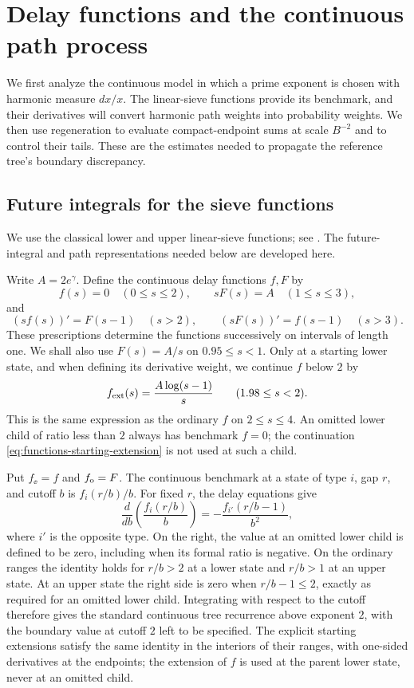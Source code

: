 \section{Delay functions and the continuous path process}
\label{sec:functions}

We first analyze the continuous model in which a prime exponent is chosen
with harmonic measure \(dx/x\).  The linear-sieve functions provide its
benchmark, and their derivatives will convert harmonic path weights into
probability weights.  We then use regeneration to evaluate compact-endpoint
sums at scale \(B^{-2}\) and to control their tails.  These are the
estimates needed to propagate the reference tree's boundary discrepancy.

\subsection{Future integrals for the sieve functions}

We use the classical lower and upper linear-sieve functions; see
\cite[Section~21.2.2]{MontgomeryVaughanII}. The future-integral and path
representations needed below are developed here.

Write \(A=2e^\gamma\).  Define the continuous delay functions \(f,F\) by
\[
 f(s)=0\quad(0\le s\le2),\qquad sF(s)=A\quad(1\le s\le3),
\]
and
\[
 (sf(s))'=F(s-1)\quad(s>2),\qquad
 (sF(s))'=f(s-1)\quad(s>3).
\]
These prescriptions determine the functions successively on intervals of
length one.  We shall also use \(F(s)=A/s\) on \(0.95\le s<1\).
Only at a starting lower state, and when defining its derivative weight,
we continue \(f\) below \(2\) by
\begin{equation}\label{eq:functions-starting-extension}
 f_{\rm ext}(s)=\frac{A\log(s-1)}s\qquad(1.98\le s<2).
\end{equation}
This is the same expression as the ordinary \(f\) on \(2\le s\le4\).
An omitted lower child of ratio less than \(2\) always has benchmark
\(f=0\); the continuation \eqref{eq:functions-starting-extension} is not
used at such a child.

Put \(f_\ee=f\) and \(f_\mathrm o=F\).  The continuous benchmark at a state
of type \(i\), gap \(r\), and cutoff \(b\) is \(f_i(r/b)/b\).
For fixed \(r\), the delay equations give
\begin{equation}\label{eq:functions-benchmark-cutoff}
 \frac{d}{db}\left(\frac{f_i(r/b)}b\right)
       =-\frac{f_{i'}(r/b-1)}{b^2},
\end{equation}
where \(i'\) is the opposite type.  On the right, the value at an
omitted lower child is defined to be zero, including when its formal
ratio is negative.  On the ordinary ranges the identity holds for
\(r/b>2\) at a lower state and \(r/b>1\) at an upper state.
At an upper state the right side is zero when \(r/b-1\le2\), exactly
as required for an omitted lower child.  Integrating with respect to the
cutoff therefore gives the standard continuous tree recurrence above
exponent \(2\), with the boundary value at cutoff \(2\) left to be
specified.  The explicit starting extensions satisfy the same identity
in the interiors of their ranges, with one-sided derivatives at the
endpoints; the extension of \(f\) is used at the parent lower state,
never at an omitted child.

